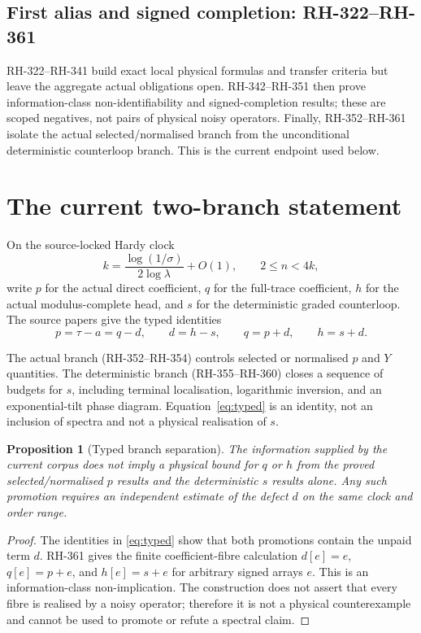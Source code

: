 \documentclass[11pt]{article}
\newtheorem{proposition}[theorem]{Proposition}
\theoremstyle{definition}
\theoremstyle{remark}
\begin{document}
\subsection{First alias and signed completion: RH-322--RH-361}

RH-322--RH-341 build exact local physical formulas and transfer criteria but
leave the aggregate actual obligations open.  RH-342--RH-351 then prove
information-class non-identifiability and signed-completion results; these
are scoped negatives, not pairs of physical noisy operators.  Finally,
RH-352--RH-361 isolate the actual selected/normalised branch from the
unconditional deterministic counterloop branch.  This is the current endpoint
used below.

\section{The current two-branch statement}

On the source-locked Hardy clock
\[
 k=\frac{\log(1/\sigma)}{2\log\lambda}+O(1),\qquad 2\le n<4k,
\]
write $p$ for the actual direct coefficient, $q$ for the full-trace
coefficient, $h$ for the actual modulus-complete head, and $s$ for the
deterministic graded counterloop.  The source papers give the typed identities
\begin{equation}
 p=\tau-a=q-d,\qquad d=h-s,
 \qquad q=p+d,\qquad h=s+d. \label{eq:typed}
\end{equation}

The actual branch (RH-352--RH-354) controls selected or normalised $p$ and
$Y$ quantities.  The deterministic branch (RH-355--RH-360) closes a sequence
of budgets for $s$, including terminal localisation, logarithmic inversion,
and an exponential-tilt phase diagram.  Equation~\eqref{eq:typed} is an
identity, not an inclusion of spectra and not a physical realisation of $s$.

\begin{proposition}[Typed branch separation]
The information supplied by the current corpus does not imply a physical
bound for $q$ or $h$ from the proved selected/normalised $p$ results and the
deterministic $s$ results alone.  Any such promotion requires an independent
estimate of the defect $d$ on the same clock and order range.
\end{proposition}
\begin{proof}
The identities in \eqref{eq:typed} show that both promotions contain the
unpaid term $d$.  RH-361 gives the finite coefficient-fibre calculation
\(d[e]=e\), \(q[e]=p+e\), and \(h[e]=s+e\) for arbitrary signed arrays $e$.
This is an information-class non-implication.  The construction does not
assert that every fibre is realised by a noisy operator; therefore it is not a
physical counterexample and cannot be used to promote or refute a spectral
claim.
\end{proof}
\end{document}
